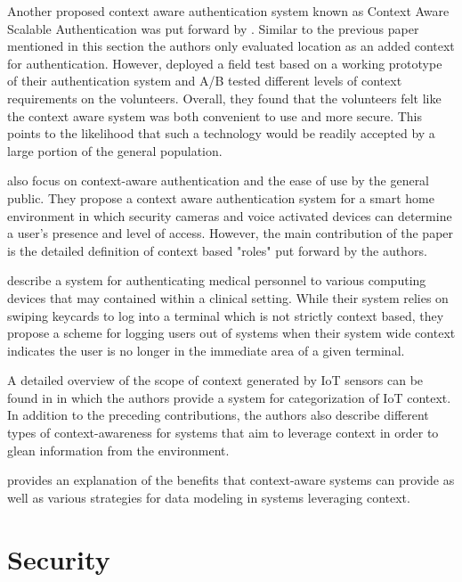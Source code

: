 \documentclass[11pt,journal]{IEEEtran}
\begin{document}
Another proposed context aware authentication system known as Context Aware Scalable Authentication was put forward by \citet{hayashi2013casa}.  Similar to the previous paper mentioned in this section the authors only evaluated location as an added context for authentication.  However, \citet{hayashi2013casa} deployed a field test based on a working prototype of their authentication system and A/B tested different levels of context requirements on the volunteers.  Overall, they found that the volunteers felt like the context aware system was both convenient to use and more secure.  This points to the likelihood that such a technology would be readily accepted by a large portion of the general population.

\citet{covington2002context} also focus on context-aware authentication and the ease of use by the general public.  They propose a context aware authentication system for a smart home environment in which security cameras and voice activated devices can determine a user's presence and level of access.  However, the main contribution of the paper is the detailed definition of context based "roles" put forward by the authors.

\citet{bardram2003context} describe a system for authenticating medical personnel to various computing devices that may contained within a clinical setting.  While their system relies on swiping keycards to log into a terminal which is not strictly context based, they propose a scheme for logging users out of systems when their system wide context indicates the user is no longer in the immediate area of a given terminal.

A detailed overview of the scope of context generated by IoT sensors can be found in \citet{Habib:2015} in which the authors provide a system for categorization of IoT context.  In addition to the preceding contributions, the authors also describe different types of context-awareness for systems that aim to leverage context in order to glean information from the environment.

\citet{strang2004context} provides an explanation of the benefits that context-aware systems can provide as well as various strategies for data modeling in systems leveraging context. 


\section{Security}
\end{document}
